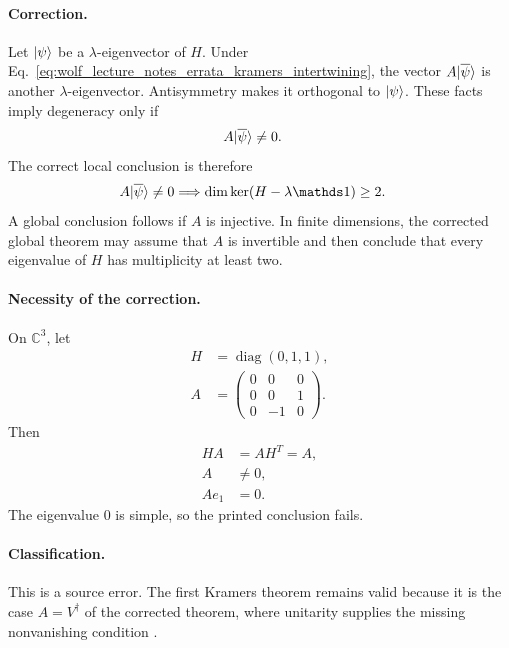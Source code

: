 \documentclass{article}
\begin{document}
\paragraph{Correction.}
Let $|\psi\rangle$ be a $\lambda$-eigenvector of $H$. Under
Eq.~\ref{eq:wolf_lecture_notes_errata_kramers_intertwining}, the vector
$A|\overline\psi\rangle$ is another $\lambda$-eigenvector. Antisymmetry makes it
orthogonal to $|\psi\rangle$. These facts imply degeneracy only if
\begin{align}
    A|\overline\psi\rangle&\neq0.
    \label{eq:wolf_lecture_notes_errata_kramers_partner_nonzero}
\end{align}
The correct local conclusion is therefore
\begin{align}
    A\ket{\overline\psi}\neq0
        &\Longrightarrow \dim\ker(H-\lambda\Id)\geq2.
    \label{eq:wolf_lecture_notes_errata_kramers_local_conclusion}
\end{align}
A global conclusion follows if $A$ is injective. In finite dimensions, the
corrected global theorem may assume that $A$ is invertible and then conclude
that every eigenvalue of $H$ has multiplicity at least two.

\paragraph{Necessity of the correction.}
On $\mathbb C^3$, let
\begin{align}
    H&=\operatorname{diag}(0,1,1),
    \label{eq:wolf_lecture_notes_errata_kramers_counterexample_h}\\
    A&=
    \begin{pmatrix}
        0&0&0\\
        0&0&1\\
        0&-1&0
    \end{pmatrix}.
    \label{eq:wolf_lecture_notes_errata_kramers_counterexample_a}
\end{align}
Then
\begin{align}
    HA&=AH^T=A,
    \label{eq:wolf_lecture_notes_errata_kramers_counterexample_intertwining}\\
    A&\neq0,
    \label{eq:wolf_lecture_notes_errata_kramers_counterexample_nonzero}\\
    Ae_1&=0.
    \label{eq:wolf_lecture_notes_errata_kramers_counterexample_kernel}
\end{align}
The eigenvalue $0$ is simple, so the printed conclusion fails.

\paragraph{Classification.}
This is a source error. The first Kramers theorem remains valid because it is
the case $A=V^\dagger$ of the corrected theorem, where unitarity supplies the
missing nonvanishing condition \cite{Wolf2012Quantum}.
\end{document}
